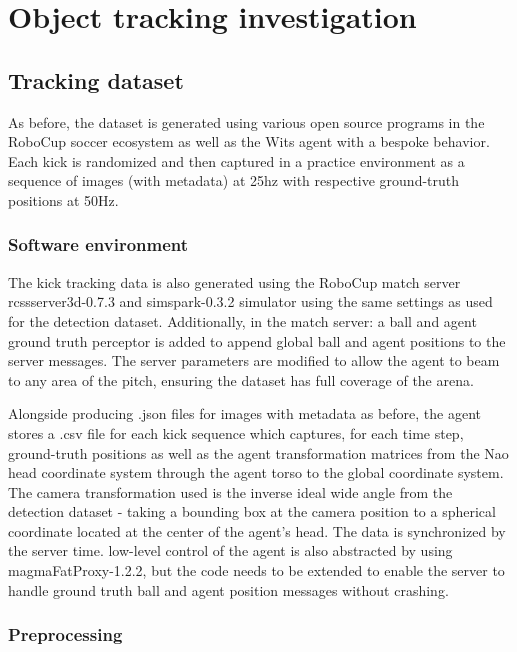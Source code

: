 \documentclass[a4paper,twoside,12pt]{report}
\begin{document}
\chapter{Object tracking investigation}

\section{Tracking dataset}
As before, the dataset is generated using various open source programs in the RoboCup soccer ecosystem as well as the Wits agent with a bespoke behavior. Each kick is randomized and then captured in a practice environment as a sequence of images (with metadata) at 25hz with respective ground-truth positions at 50Hz.

\subsection{Software environment}
The kick tracking data is also generated using the RoboCup match server rcssserver3d-0.7.3 and simspark-0.3.2 simulator using the same settings as used for the detection dataset. Additionally, in the match server: a ball and agent ground truth perceptor is added to append global ball and agent positions to the server messages. The server parameters are modified to allow the agent to beam to any area of the pitch, ensuring the dataset has full coverage of the arena.

Alongside producing .json files for images with metadata as before, the agent stores a .csv file for each kick sequence which captures, for each time step, ground-truth positions as well as the agent transformation matrices from the Nao head coordinate system through the agent torso to the global coordinate system. The camera transformation used is the inverse ideal wide angle from the detection dataset - taking a bounding box at the camera position to a spherical coordinate located at the center of the agent's head. The data is synchronized by the server time. low-level control of the agent is also abstracted by using magmaFatProxy-1.2.2, but the code needs to be extended to enable the server to handle ground truth ball and agent position messages without crashing. 

\subsection{Preprocessing}
\end{document}
